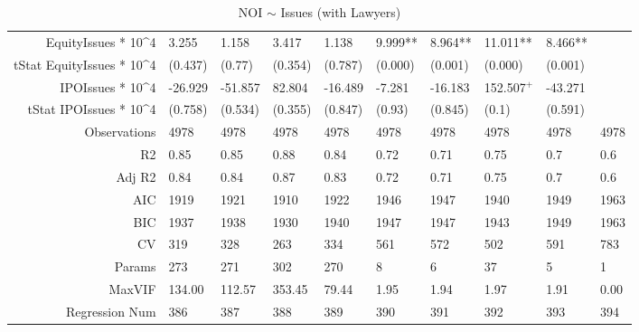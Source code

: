 \begin{table}[ht]
\begin{tabular}{rlllllllll}
  EquityIssues * 10^4 & 3.255 & 1.158 & 3.417 & 1.138 & 9.999** & 8.964** & 11.011** & 8.466** &  \\ 
  tStat EquityIssues * 10^4 & (0.437) & (0.77) & (0.354) & (0.787) & (0.000) & (0.001) & (0.000) & (0.001) &  \\ 
  IPOIssues * 10^4 & -26.929 & -51.857 & 82.804 & -16.489 & -7.281 & -16.183 & 152.507$^{+}$ & -43.271 &  \\ 
  tStat IPOIssues * 10^4 & (0.758) & (0.534) & (0.355) & (0.847) & (0.93) & (0.845) & (0.1) & (0.591) &  \\ 
  Observations & 4978 & 4978 & 4978 & 4978 & 4978 & 4978 & 4978 & 4978 & 4978 \\ 
  R2 & 0.85 & 0.85 & 0.88 & 0.84 & 0.72 & 0.71 & 0.75 & 0.7 & 0.6 \\ 
  Adj R2 & 0.84 & 0.84 & 0.87 & 0.83 & 0.72 & 0.71 & 0.75 & 0.7 & 0.6 \\ 
  AIC & 1919 & 1921 & 1910 & 1922 & 1946 & 1947 & 1940 & 1949 & 1963 \\ 
  BIC & 1937 & 1938 & 1930 & 1940 & 1947 & 1947 & 1943 & 1949 & 1963 \\ 
  CV & 319 & 328 & 263 & 334 & 561 & 572 & 502 & 591 & 783 \\ 
  Params & 273 & 271 & 302 & 270 & 8 & 6 & 37 & 5 & 1 \\ 
  MaxVIF & 134.00 & 112.57 & 353.45 & 79.44 & 1.95 & 1.94 & 1.97 & 1.91 & 0.00 \\ 
  Regression Num & 386 & 387 & 388 & 389 & 390 & 391 & 392 & 393 & 394 \\ 
   \hline
\end{tabular}
\caption{NOI $\sim$ Issues (with Lawyers)} 
\end{table}
